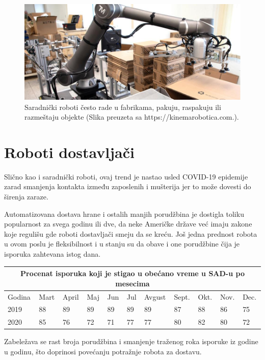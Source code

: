 \documentclass{report}
\begin{document}
\begin{figure}
\centering
\includegraphics[scale=0.41]{Cobot.jpg}
\caption{Saradnički roboti često rade u fabrikama, pakuju, raspakuju ili razmeštaju objekte (Slika preuzeta sa https://kinemarobotica.com.).}
\end{figure}

\chapter{Roboti dostavljači}
Slično kao i saradnički roboti, ovaj trend je nastao usled COVID-19 epidemije zarad smanjenja kontakta između zaposlenih i mušterija jer to može dovesti do širenja zaraze.

Automatizovana dostava hrane i ostalih manjih porudžbina je dostigla toliku popularnost za svega godinu ili dve, da neke Američke države već imaju zakone koje regulišu gde roboti dostavljači smeju da se kreću. Još jedna prednost robota u ovom poslu je fleksibilnost i u stanju su da obave i one porudžbine čija je isporuka zahtevana istog dana.
\vspace{0.25cm}
\begin{center}
\begin{tabular}{ |p{1cm}|p{1cm}|p{1cm}|p{1cm} |p{1cm}|p{1cm}|p{1cm}|p{1cm}|p{1cm}|p{1cm}|p{1cm}|}
\hline
\multicolumn{11}{|c|}{Procenat isporuka koji je stigao u obećano vreme u SAD-u po mesecima} \\
\hline
Godina & Mart & April & Maj & Jun & Jul & Avgust & Sept. & Okt. & Nov. & Dec. \\
\hline
2019 & 88 & 89 & 89 & 89 & 89 & 89 & 87 & 88 & 86 & 75 \\
2020 & 85 & 76 & 72 & 71 & 77 & 77 & 80 & 82 & 80 & 72 \\
\hline
\end{tabular}
\end{center}
\vspace{0.25cm}
Zabeležava se rast broja porudžbina i smanjenje traženog roka isporuke iz godine u godinu, što doprinosi povećanju potražnje robota za dostavu. \cite{robotics2022, sameday}  
\end{document}
